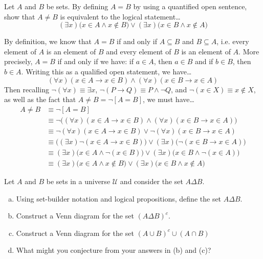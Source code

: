 \documentclass[11pt,letterpaper]{article}
\begin{document}
 Let $A$ and $B$ be sets. By defining $A= B$ by using a quantified open sentence, show that $A \neq B$ is equivalent to the logical statement\dots
	\[
	(\exists x) \big( x \in A \wedge x \notin B \big) \vee (\exists x) \big( x \in B \wedge x \notin A \big)
	\] \pspace

\sol By definition, we know that $A= B$ if and only if $A \subseteq B$ and $B \subseteq A$, i.e. every element of $A$ is an element of $B$ and every element of $B$ is an element of $A$. More precisely, $A= B$ if and only if we have: if $a \in A$, then $a \in B$ and if $b \in B$, then $b \in A$. Writing this as a qualified open statement, we have\dots
	\[
	(\forall x)(x \in A \to x \in B) \wedge (\forall x)(x \in B \to x \in A)
	\]
Then recalling $\neg (\forall x) \equiv \exists x$, $\neg (P \to Q) \equiv P \wedge \neg Q$, and $\neg (x \in X) \equiv x \notin X$, as well as the fact that $A \neq B= \neg [A= B]$, we must have\dots
	\[
	\begin{aligned}
	A \neq B&\equiv \neg [A= B] \\[0.3cm]
	&\equiv \neg \big( (\forall x)(x \in A \to x \in B) \wedge (\forall x)(x \in B \to x \in A) \big) \\[0.3cm]
	&\equiv \neg(\forall x)(x \in A \to x \in B) \vee \neg(\forall x)(x \in B \to x \in A) \\[0.3cm]
	&\equiv \big( (\exists x) \neg(x \in A \to x \in B) \big) \vee (\exists x) \big( \neg(x \in B \to x \in A) \big) \\[0.3cm] 
	&\equiv (\exists x) \big(x \in A \wedge \neg(x \in B) \big) \vee (\exists x) \big(x \in B \wedge \neg (x \in A) \big) \\[0.3cm]
	&\equiv (\exists x) \big( x \in A \wedge x \notin B \big) \vee (\exists x) \big( x \in B \wedge x \notin A \big)
	\end{aligned}
	\]



\newpage



 Let $A$ and $B$ be sets in a universe $\mathcal{U}$ and consider the set $A \Delta B$. 
	\begin{enumerate}[(a)]
	\item Using set-builder notation and logical propositions, define the set $A \Delta B$.
	\item Construct a Venn diagram for the set $(A \Delta B)^c$.
	\item Construct a Venn diagram for the set $(A \cup B)^c \cup (A \cap B)$
	\item What might you conjecture from your answers in (b) and (c)?
	\end{enumerate} \pspace
\end{document}
